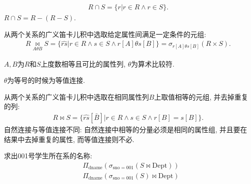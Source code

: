 \begin{definition}[交运算]
\begin{align*}
    R\cap S =\{r|r\in R\land r \in S\}.
\end{align*}
$R\cap S = R-(R-S)$.
\end{definition}

\begin{definition}[$\theta$连接]
从两个关系的广义笛卡儿积中选取给定属性间满足一定条件的元组:
\begin{align*}
    R \underset{{A\theta B}}{\bowtie} S = \{\widehat{rs}|r\in R \land s \in S \land r[A]\theta s[B]\}
    = \sigma_{r[A]\theta s[B]}(R\times S).
\end{align*}
\end{definition}

$A,B$为$R$和$S$上度数相等且可比的属性列, $\theta$为算术比较符.

\begin{definition}[等值连接]
$\theta$为等号的时候为等值连接.
\end{definition}

\begin{definition}[自然连接]
从两个关系的广义笛卡儿积中选取在相同属性列$B$上取值相等的元组, 并去掉重复的列:
\begin{align*}
    R \bowtie S = \{ \widehat{rs}[\bar{B}] | r \in R \land s \in S \land r[B]=s[B] \}.
\end{align*}
自然连接与等值连接不同: 自然连接中相等的分量必须是相同的属性组, 并且要在结果中去掉重复的属性, 而等值连接则不必.
\end{definition}

\begin{example}
求出001号学生所在系的名称:
\begin{align*}
    &\Pi_{\text{dname}}(\sigma_{\text{sno}=001}(S\bowtie \text{Dept})) \\
    &\Pi_{\text{dname}}(\sigma_{\text{sno}=001}(S)\bowtie \text{Dept})
\end{align*}
\end{example}

